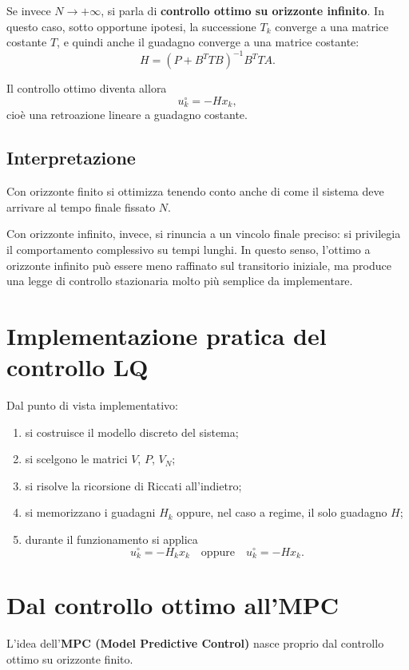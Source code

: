 Se invece \(N\to+\infty\), si parla di \textbf{controllo ottimo su orizzonte infinito}.
In questo caso, sotto opportune ipotesi, la successione \(T_k\) converge a una matrice
costante \(T\), e quindi anche il guadagno converge a una matrice costante:
\[
H=\left(P+B^T T B\right)^{-1}B^T T A.
\]

Il controllo ottimo diventa allora
\[
u_k^\circ=-Hx_k,
\]
cioè una retroazione lineare a guadagno costante.

\subsection{Interpretazione}

Con orizzonte finito si ottimizza tenendo conto anche di come il sistema deve arrivare
al tempo finale fissato \(N\).

Con orizzonte infinito, invece, si rinuncia a un vincolo finale preciso:
si privilegia il comportamento complessivo su tempi lunghi.
In questo senso, l'ottimo a orizzonte infinito può essere meno raffinato sul transitorio
iniziale, ma produce una legge di controllo stazionaria molto più semplice da implementare.

\section{Implementazione pratica del controllo LQ}

Dal punto di vista implementativo:
\begin{enumerate}
    \item si costruisce il modello discreto del sistema;
    \item si scelgono le matrici \(V\), \(P\), \(V_N\);
    \item si risolve la ricorsione di Riccati all'indietro;
    \item si memorizzano i guadagni \(H_k\) oppure, nel caso a regime, il solo guadagno \(H\);
    \item durante il funzionamento si applica
    \[
    u_k^\circ=-H_kx_k
    \quad\text{oppure}\quad
    u_k^\circ=-Hx_k.
    \]
\end{enumerate}

\section{Dal controllo ottimo all'MPC}

L'idea dell'\textbf{MPC (Model Predictive Control)} nasce proprio dal controllo ottimo
su orizzonte finito.

